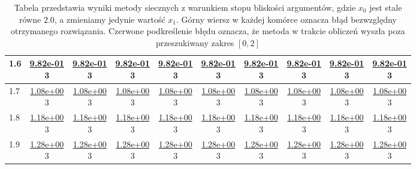 \begin{table}[H]
\begin{tabular}{|l||c|c|c|c|c|c|c|c|c|}
\hline
 1.6 & \makecell{\ul{9.82e-01} \\ 3} & \makecell{\ul{9.82e-01} \\ 3} & \makecell{\ul{9.82e-01} \\ 3} & \makecell{\ul{9.82e-01} \\ 3} & \makecell{\ul{9.82e-01} \\ 3} & \makecell{\ul{9.82e-01} \\ 3} & \makecell{\ul{9.82e-01} \\ 3} & \makecell{\ul{9.82e-01} \\ 3} & \makecell{\ul{9.82e-01} \\ 3} \\
\hline
 1.7 & \makecell{\ul{1.08e+00} \\ 3} & \makecell{\ul{1.08e+00} \\ 3} & \makecell{\ul{1.08e+00} \\ 3} & \makecell{\ul{1.08e+00} \\ 3} & \makecell{\ul{1.08e+00} \\ 3} & \makecell{\ul{1.08e+00} \\ 3} & \makecell{\ul{1.08e+00} \\ 3} & \makecell{\ul{1.08e+00} \\ 3} & \makecell{\ul{1.08e+00} \\ 3} \\
\hline
 1.8 & \makecell{\ul{1.18e+00} \\ 3} & \makecell{\ul{1.18e+00} \\ 3} & \makecell{\ul{1.18e+00} \\ 3} & \makecell{\ul{1.18e+00} \\ 3} & \makecell{\ul{1.18e+00} \\ 3} & \makecell{\ul{1.18e+00} \\ 3} & \makecell{\ul{1.18e+00} \\ 3} & \makecell{\ul{1.18e+00} \\ 3} & \makecell{\ul{1.18e+00} \\ 3} \\
\hline
 1.9 & \makecell{\ul{1.28e+00} \\ 3} & \makecell{\ul{1.28e+00} \\ 3} & \makecell{\ul{1.28e+00} \\ 3} & \makecell{\ul{1.28e+00} \\ 3} & \makecell{\ul{1.28e+00} \\ 3} & \makecell{\ul{1.28e+00} \\ 3} & \makecell{\ul{1.28e+00} \\ 3} & \makecell{\ul{1.28e+00} \\ 3} & \makecell{\ul{1.28e+00} \\ 3} \\
\hline
 \bottomrule
\end{tabular}
\caption{Tabela przedstawia wyniki metody siecznych z warunkiem stopu bliskości argumentów, gdzie $x_0$ jest stale równe $2.0$, a zmieniamy jedynie wartość $x_1$.
Górny wiersz w każdej komórce oznacza błąd bezwzględny otrzymanego rozwiązania.
Czerwone podkreślenie błędu oznacza, że metoda w trakcie obliczeń wyszła poza przeszukiwany zakres $[0,2]$}
\label{tab:secant_x_a}
\end{table}